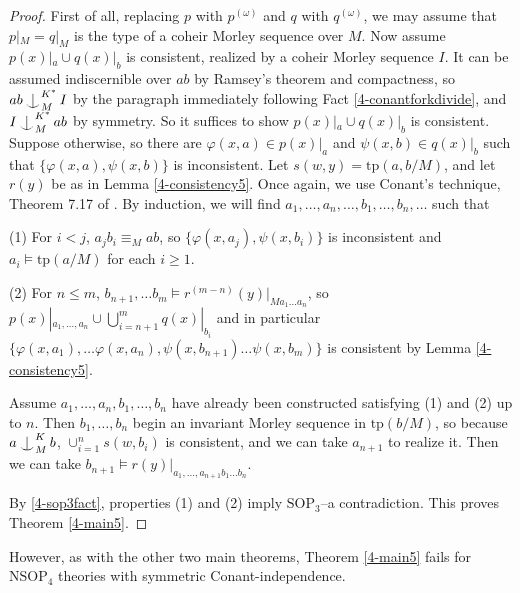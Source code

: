 \documentclass[12pt]{amsart}
\theoremstyle{definition}
\def\Ind#1#2{#1\setbox0=\hbox{$#1x$}\kern\wd0\hbox to 0pt{\hss$#1\mid$\hss}
\lower.9\ht0\hbox to 0pt{\hss$#1\smile$\hss}\kern\wd0}
\def\ind{\mathop{\mathpalette\Ind{}}}
\begin{document}
\begin{proof}

First of all, replacing $p$ with $p^{(\omega)}$ and $q$ with $q^{(\omega)}$, we may assume that $p|_{M}=q|_{M}$ is the type of a coheir Morley sequence over $M$. Now assume $p(x)|_{a} \cup q(x)|_{b}$ is consistent, realized by a coheir Morley sequence $I$. It can be assumed indiscernible over $ab$ by Ramsey's theorem and compactness, so $ab \ind^{K^{*}}_{M} I$ by the paragraph immediately following Fact \ref{4-conantforkdivide}, and $I \ind^{K^{*}}_{M} ab$ by symmetry. So it suffices to show $p(x)|_{a} \cup q(x)|_{b}$ is consistent. Suppose otherwise, so there are $\varphi(x, a) \in p(x)|_{a} $ and $\psi(x, b) \in q(x)|_{b}$ such that $\{\varphi(x, a), \psi(x, b)\}$ is inconsistent. Let $s(w, y) = \mathrm{tp}(a, b/M)$, and let $r(y)$ be as in Lemma \ref{4-consistency5}. Once again, we use Conant's technique, Theorem 7.17 of \cite{Co15}. By induction, we will find $a_{1}, \ldots, a_{n}, \ldots, b_{1}, \ldots, b_{n}, \ldots$ such that

(1) For $i < j$, $a_{j} b_{i} \equiv_{M} ab$, so $\{\varphi(x, a_{j}), \psi(x, b_{i})\}$ is inconsistent and $a_{i} \models \mathrm{tp}(a/M)$ for each $i \geq 1$.

(2) For $n \leq m$, $b_{n+1}, \ldots b_{m} \models r^{(m-n)}(y)|_{Ma_{1}\ldots a_{n}}$, so $p(x)|_{a_1, \ldots, a_n}\cup \bigcup^{m}_{i=n+1} q(x)|_{b_{i}}$ and in particular $\{\varphi(x, a_{1}), \ldots \varphi(x, a_{n}), \psi(x, b_{n+1}) \ldots \psi(x, b_{m})\}$ is consistent by Lemma \ref{4-consistency5}.

Assume $a_{1}, \ldots, a_{n}, b_{1}, \ldots, b_{n}$ have already been constructed satisfying (1) and (2) up to $n$. Then  $b_{1}, \ldots, b_{n}$ begin an invariant Morley sequence in $\mathrm{tp}(b/M)$, so because $a \ind^{K}_{M} b$, $\cup_{i =1}^{n} s(w, b_{i})$ is consistent, and we can take $a_{n+1}$ to realize it. Then we can take $b_{n+1} \models r(y)|_{a_{1}, \ldots, a_{n+1}b_{1}\ldots b_{n}}$.

By \ref{4-sop3fact}, properties (1) and (2) imply $\mathrm{SOP}_{3}$--a contradiction. This proves Theorem \ref{4-main5}.

    
\end{proof}



However, as with the other two main theorems, Theorem \ref{4-main5} fails for $\mathrm{NSOP}_{4}$ theories with symmetric Conant-independence.
\end{document}
